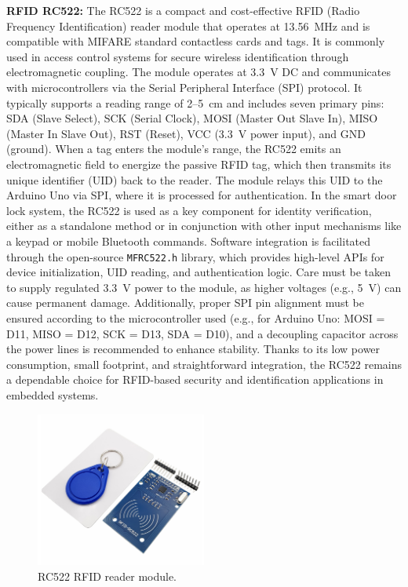 \documentclass[conference, onecolumn]{IEEEtran}
\begin{document}
 \textbf{RFID RC522:} The RC522 is a compact and cost-effective RFID (Radio Frequency Identification) reader module that operates at 13.56~MHz and is compatible with MIFARE standard contactless cards and tags. It is commonly used in access control systems for secure wireless identification through electromagnetic coupling. The module operates at 3.3~V DC and communicates with microcontrollers via the Serial Peripheral Interface (SPI) protocol. It typically supports a reading range of 2–5~cm and includes seven primary pins: SDA (Slave Select), SCK (Serial Clock), MOSI (Master Out Slave In), MISO (Master In Slave Out), RST (Reset), VCC (3.3~V power input), and GND (ground). When a tag enters the module’s range, the RC522 emits an electromagnetic field to energize the passive RFID tag, which then transmits its unique identifier (UID) back to the reader. The module relays this UID to the Arduino Uno via SPI, where it is processed for authentication. In the smart door lock system, the RC522 is used as a key component for identity verification, either as a standalone method or in conjunction with other input mechanisms like a keypad or mobile Bluetooth commands. Software integration is facilitated through the open-source \texttt{MFRC522.h} library, which provides high-level APIs for device initialization, UID reading, and authentication logic. Care must be taken to supply regulated 3.3~V power to the module, as higher voltages (e.g., 5~V) can cause permanent damage. Additionally, proper SPI pin alignment must be ensured according to the microcontroller used (e.g., for Arduino Uno: MOSI = D11, MISO = D12, SCK = D13, SDA = D10), and a decoupling capacitor across the power lines is recommended to enhance stability. Thanks to its low power consumption, small footprint, and straightforward integration, the RC522 remains a dependable choice for RFID-based security and identification applications in embedded systems.

\begin{figure}[H]
	\centering
	\includegraphics[width=0.5\textwidth]{RFID_RC522.pdf}
	\caption{RC522 RFID reader module.}
	\label{fig6}
\end{figure}
\end{document}
